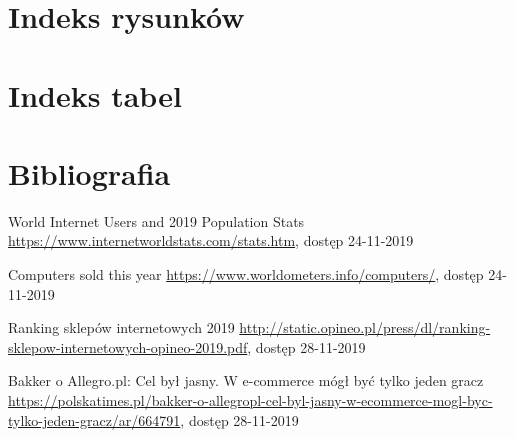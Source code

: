 \documentclass[12pt]{article}
\numberwithin{figure}{section}
\begin{document}
\begin{sloppypar}
    \clearpage

    \section{Indeks rysunków}
        \listoffigures
    \clearpage    
    
    \section{Indeks tabel}
        \listoftables
    \clearpage
    
    \section{Bibliografia}
    \renewcommand{\section}[2]{}
    \begin{thebibliography}{99}
    
    World Internet Users and 2019 Population Stats
    \url{https://www.internetworldstats.com/stats.htm}, dostęp 24-11-2019

    Computers sold this year
    \url{https://www.worldometers.info/computers/}, dostęp 24-11-2019
     
    Ranking sklepów internetowych 2019
    \url{http://static.opineo.pl/press/dl/ranking-sklepow-internetowych-opineo-2019.pdf}, dostęp 28-11-2019
    
    Bakker o Allegro.pl: Cel był jasny. W e-commerce mógł być tylko jeden gracz
    \url{https://polskatimes.pl/bakker-o-allegropl-cel-byl-jasny-w-ecommerce-mogl-byc-tylko-jeden-gracz/ar/664791}, dostęp 28-11-2019
    

\end{thebibliography}
\end{sloppypar}
\end{document}
